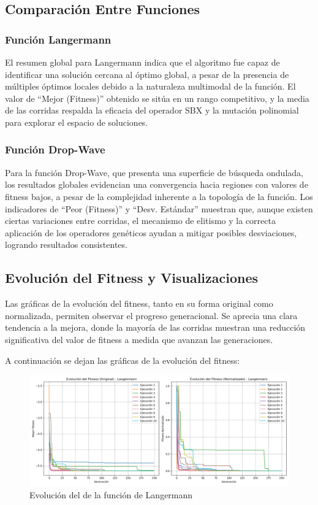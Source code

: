 \subsection{Comparaci\'on Entre Funciones}
\subsubsection{Funci\'on Langermann}
El resumen global para Langermann indica que el algoritmo fue capaz de identificar una soluci\'on cercana al \'optimo global, a pesar de la presencia de m\'ultiples \'optimos locales debido a la naturaleza multimodal de la funci\'on. El valor de ``Mejor (Fitness)'' obtenido se sit\'ua en un rango competitivo, y la media de las corridas respalda la eficacia del operador SBX y la mutaci\'on polinomial para explorar el espacio de soluciones.

\subsubsection{Funci\'on Drop-Wave}
Para la funci\'on Drop-Wave, que presenta una superficie de b\'usqueda ondulada, los resultados globales evidencian una convergencia hacia regiones con valores de fitness bajos, a pesar de la complejidad inherente a la topolog\'ia de la funci\'on. Los indicadores de ``Peor (Fitness)'' y ``Desv. Est\'andar'' muestran que, aunque existen ciertas variaciones entre corridas, el mecanismo de elitismo y la correcta aplicaci\'on de los operadores gen\'eticos ayudan a mitigar posibles desviaciones, logrando resultados consistentes.

\subsection{Evoluci\'on del Fitness y Visualizaciones}
Las gr\'aficas de la evoluci\'on del fitness, tanto en su forma original como normalizada, permiten observar el progreso generacional. Se aprecia una clara tendencia a la mejora, donde la mayor\'ia de las corridas muestran una reducci\'on significativa del valor de fitness a medida que avanzan las generaciones.

A continuación se dejan las gráficas de la evolución del fitness:
\begin{figure}[H]
    \centering
    \includegraphics[width=\textwidth]{secciones/tablas/langermann/evolucion_fitness_langermann.png}
    \caption{Evolución del  de la función de Langermann}
    \label{fig:fitness_langermann}
\end{figure}

